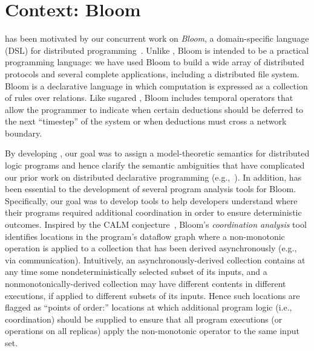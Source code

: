 \section{Context: Bloom}
\lang has been motivated by our concurrent work on \emph{Bloom}, a
domain-specific language (DSL) for distributed programming~\cite{bloom}. Unlike
\lang, Bloom is intended to be a practical programming language: we have used
Bloom to build a wide array of distributed protocols and several complete
applications, including a distributed file system. Bloom is a declarative
language in which computation is expressed as a collection of rules over
relations. Like sugared \lang, Bloom includes temporal operators that allow the
programmer to indicate when certain deductions should be deferred to the next
``timestep'' of the system or when deductions must cross a network
boundary. %

By developing \lang, our goal was to assign a model-theoretic semantics for
distributed logic programs and hence clarify the semantic ambiguities that have
complicated our prior work on distributed declarative programming
(e.g.,~\cite{Mao2009,navarro-oper-sem}). In addition, \lang has been essential
to the development of several program analysis tools for Bloom. Specifically,
our goal was to develop tools to help developers understand where their programs
required additional coordination in order to ensure deterministic
outcomes. Inspired by the CALM conjecture~\cite{cidr11,declarative-imperative},
Bloom's \emph{coordination analysis} tool identifies locations in the program's
dataflow graph where a non-monotonic operation is applied to a collection that
has been derived asynchronously (e.g., via communication).  Intuitively, an
asynchronously-derived collection contains at any time some nondeterministically
selected subset of its inputs, and a nonmonotonically-derived collection may
have different contents in different executions, if applied to different subsets
of its inputs.  Hence such locations are flagged as ``points of order:''
locations at which additional program logic (i.e., coordination) should be
supplied to ensure that all program executions (or operations on all replicas)
apply the non-monotonic operator to the same input set.

